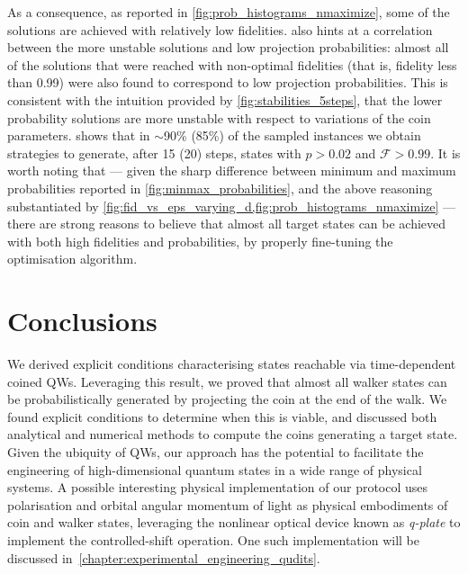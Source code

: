 As a consequence, as reported in \cref{fig:prob_histograms_nmaximize}, some of the solutions are achieved with relatively low fidelities.
 also hints at a correlation between the more unstable solutions and low projection probabilities:
almost all of the solutions that were reached with non-optimal fidelities (that is, fidelity less than 0.99) were also found to correspond to low projection probabilities.
This is consistent with the intuition provided by \cref{fig:stabilities_5steps},
that the lower probability solutions are more unstable with respect to variations of the coin parameters.
 shows that in $\sim$90\% (85\%) of the sampled instances we obtain strategies to generate, after 15 (20) steps, states with $p > 0.02$ and $\mathcal F > 0.99$.
It is worth noting that --- given the sharp difference between minimum and maximum probabilities reported in \cref{fig:minmax_probabilities}, and the above reasoning substantiated by \cref{fig:fid_vs_eps_varying_d,fig:prob_histograms_nmaximize} ---
there are strong reasons to believe that almost all target states can be achieved with both high fidelities and probabilities,
by properly fine-tuning the optimisation algorithm.


\section{Conclusions}
\label{sec:QWs:conclusions}

We derived explicit conditions characterising states reachable via time-dependent coined \acp{QW}.
Leveraging this result, we proved that almost all walker states can be probabilistically generated by projecting the coin at the end of the walk.
We found explicit conditions to determine when this is viable, and discussed both analytical and numerical methods to compute the coins generating a target state.
Given the ubiquity of \acp{QW}, our approach has the potential to facilitate the engineering of high-dimensional quantum states in a wide range of physical systems.
A possible interesting physical implementation of our protocol uses polarisation and orbital angular momentum of light as physical embodiments of coin and walker states, leveraging the nonlinear optical device known as \emph{q-plate} to implement the controlled-shift operation.
One such implementation will be discussed in~\cref{chapter:experimental_engineering_qudits}.

